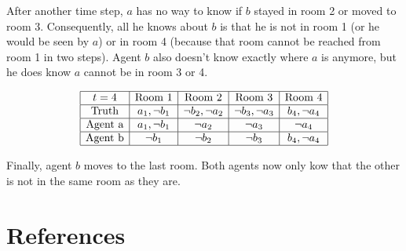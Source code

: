 \documentclass[a4paper]{scrartcl}
\begin{document}
After another time step, $a$ has no way to know if $b$ stayed in room 2 or moved to room 3. Consequently, all he knows about $b$ is that he is not in room 1 (or he would be seen by $a$) or in room 4 (because that room cannot be reached from room 1 in two steps). Agent $b$ also doesn't know exactly where $a$ is anymore, but he does know $a$ cannot be in room 3 or 4.

$$\begin{array}{|c|c|c|c|c|}
\hline
t = 4 & \text{Room 1}&\text{Room 2}&\text{Room 3}&\text{Room 4}\\
\hline
\text{Truth} & a_1,\neg b_1 & \neg b_2,\neg a_2 & \neg b_3,\neg a_3 & b_4,\neg a_4\\
\hline
\text{Agent a} & a_1,\neg b_1 & \neg a_2 & \neg a_3 & \neg a_4\\
\hline
\text{Agent b} & \neg b_1 & \neg b_2 & \neg b_3 & b_4,\neg a_4\\
\hline
\end{array}$$

Finally, agent $b$ moves to the last room. Both agents now only kow that the other is not in the same room as they are.
\section*{References}

\printbibliography
\end{document}
